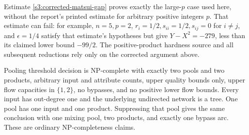 \begin{remark}\label{s3:matsui-scope}
Estimate \eqref{s3:corrected-matsui-gap} proves exactly the large-$p$
case used here, without the report's printed estimate for arbitrary
positive integers $p$. That estimate can fail: for example, $n=5,p=2$,
$r_i=1/2,s_{ii}=1/2,s_{ij}=0$ for $i\ne j$, and
$\epsilon=1/4$ satisfy that estimate's hypotheses but give
$Y-X^2=-279$, less than its claimed lower bound $-99/2$.
The positive-product hardness source and all subsequent reductions
rely only on the corrected argument above.
\end{remark}

\begin{theorem}\label{s3:two-pools}
Pooling threshold decision is NP-complete with exactly two pools and two
products, arbitrary input and attribute counts, upper quality bounds only,
upper flow capacities in $\{1,2\}$, no bypasses, and no positive lower
flow bounds. Every input has out-degree one and the underlying undirected
network is a tree. One pool has one input and one product. Suppressing
that pool gives the same conclusion with one mixing pool, two products,
and exactly one bypass arc. These are ordinary NP-completeness claims.
\end{theorem}
